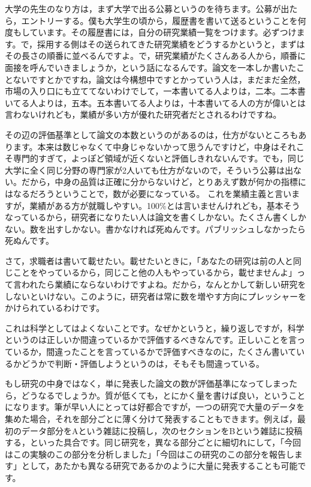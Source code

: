 \documentclass{ltjsbook}
\begin{document}
大学の先生のなり方は，まず大学で出る公募というのを待ちます。公募が出たら，エントリーする。僕も大学生の頃から，履歴書を書いて送るということを何度もしています。その履歴書には，自分の研究業績一覧をつけます。必ずつけます。で，採用する側はその送られてきた研究業績をどうするかというと，まずはその長さの順番に並べるんですよ。で，研究業績がたくさんある人から，順番に面接を呼んでいきましょうか，という話になるんです。論文を一本しか書いたことないですとかですね，論文は今構想中ですとかっていう人は，まだまだ全然，市場の入り口にも立ててないわけでして，一本書いてる人よりは，二本。二本書いてる人よりは，五本。五本書いてる人よりは，十本書いてる人の方が偉いとは言わないけれども，業績が多い方が優れた研究者だとされるわけですね。

その辺の評価基準として論文の本数というのがあるのは，仕方がないところもあります。本来は数じゃなくて中身じゃないかって思うんですけど，中身はそれこそ専門的すぎて，よっぽど領域が近くないと評価しきれないんです。でも，同じ大学に全く同じ分野の専門家が2人いても仕方がないので，そういう公募は出ない。だから，中身の品質は正確に分からないけど，とりあえず数が何かの指標にはなるだろうということで，数が必要になっている。
これを業績主義と言いますが，業績がある方が就職しやすい。100\%とは言いませんけれども，基本そうなっているから，研究者になりたい人は論文を書くしかない。たくさん書くしかない。数を出すしかない。書かなければ死ぬんです。パブリッシュしなかったら死ぬんです。

さて，求職者は書いて載せたい。載せたいときに，「あなたの研究は前の人と同じことをやっているから，同じこと他の人もやっているから，載せませんよ」って言われたら業績にならないわけですよね。だから，なんとかして新しい研究をしないといけない。このように，研究者は常に数を増やす方向にプレッシャーをかけられているわけです。

これは科学としてはよくないことです。なぜかというと，繰り返しですが，科学というのは正しいか間違っているかで評価するべきなんです。正しいことを言っているか，間違ったことを言っているかで評価すべきなのに，たくさん書いているかどうかで判断・評価しようというのは，そもそも間違っている。

もし研究の中身ではなく，単に発表した論文の数が評価基準になってしまったら，どうなるでしょうか。質が低くても，とにかく量を書けば良い，ということになります。筆が早い人にとっては好都合ですが，一つの研究で大量のデータを集めた場合，それを部分ごとに薄く分けて発表することもできます。例えば，最初のデータ部分をAという雑誌に投稿し，次のセクションをBという雑誌に投稿する，といった具合です。同じ研究を，異なる部分ごとに細切れにして，「今回はこの実験のこの部分を分析しました」「今回はこの研究のこの部分を報告します」として，あたかも異なる研究であるかのように大量に発表することも可能です。
\end{document}
